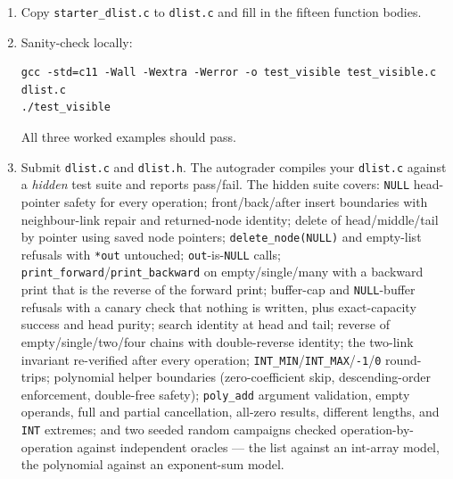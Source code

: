 \documentclass[11pt]{article}
\begin{document}
\begin{enumerate}
  \item Copy \texttt{starter\_dlist.c} to \texttt{dlist.c} and fill in the fifteen function bodies.
  \item Sanity-check locally:
\begin{verbatim}
gcc -std=c11 -Wall -Wextra -Werror -o test_visible test_visible.c dlist.c
./test_visible
\end{verbatim}
    All three worked examples should pass.
  \sloppy
  \item Submit \texttt{dlist.c} and \texttt{dlist.h}. The autograder compiles your \texttt{dlist.c} against a \emph{hidden} test suite and reports pass/fail. The hidden suite covers: \texttt{NULL} head-pointer safety for every operation; front/back/after insert boundaries with neighbour-link repair and returned-node identity; delete of head/middle/tail by pointer using saved node pointers; \texttt{delete\_node(NULL)} and empty-list refusals with \texttt{*out} untouched; \texttt{out}-is-\texttt{NULL} calls; \texttt{print\_forward}/\texttt{print\_backward} on empty/single/many with a backward print that is the reverse of the forward print; buffer-cap and \texttt{NULL}-buffer refusals with a canary check that nothing is written, plus exact-capacity success and head purity; search identity at head and tail; reverse of empty/single/two/four chains with double-reverse identity; the two-link invariant re-verified after every operation; \texttt{INT\_MIN}/\texttt{INT\_MAX}/\texttt{-1}/\texttt{0} round-trips; polynomial helper boundaries (zero-coefficient skip, descending-order enforcement, double-free safety); \texttt{poly\_add} argument validation, empty operands, full and partial cancellation, all-zero results, different lengths, and \texttt{INT} extremes; and two seeded random campaigns checked operation-by-operation against independent oracles --- the list against an int-array model, the polynomial against an exponent-sum model.
\end{enumerate}
\end{document}
